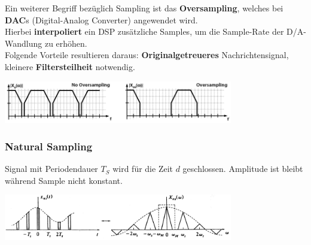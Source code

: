 Ein weiterer Begriff bezüglich Sampling ist das \textbf{Oversampling}, welches bei \textbf{DAC}s
(Digital-Analog Converter) angewendet wird. \\
Hierbei \textbf{interpoliert} ein DSP zusätzliche Samples, um die Sample-Rate der D/A-Wandlung zu
erhöhen.\\
Folgende Vorteile resultieren daraus: \textbf{Originalgetreueres} Nachrichtensignal, kleinere
\textbf{Filtersteilheit} notwendig.
	\begin{center}
		\includegraphics[width=10cm]{bilder/dig_oversampling.png}
	\end{center}

\subsubsection{Natural Sampling}
Signal mit Periodendauer $T_S$ wird für die Zeit $d$ geschlossen. Amplitude ist bleibt
während Sample nicht konstant. \\

	\begin{center}
		\includegraphics[width=10cm]{bilder/dig_naturalsampling.png}
	\end{center}

